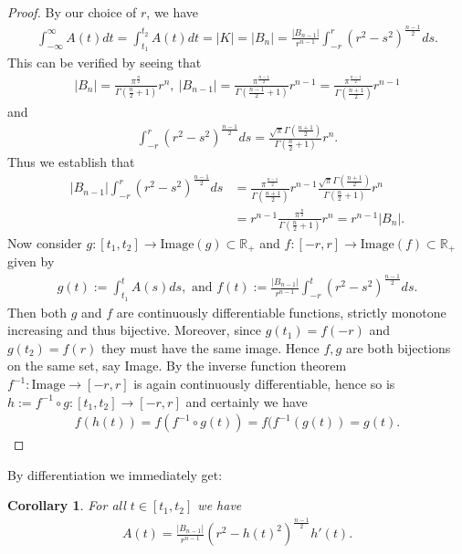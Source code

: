 \documentclass[12pt, a4paper, titlepage]{article}
\newtheorem{corollary}{Corollary}
\begin{document}
\begin{proof}
By our choice of $r$, we have 
\begin{align*}
\int_{- \infty}^\infty A(t)dt = \int_{t_1}^{t_2} A(t)dt = |K|=|B_n| = \frac{|B_{n-1}|}{r^{n-1}} \int_{-r}^r (r^2-s^2)^\frac{n-1}{2}ds.
\end{align*}
This can be verified by seeing that 
\begin{align*}
|B_n| = \frac{\pi^\frac{n}{2}}{\Gamma \left( \frac{n}{2}+1\right)}r^n, \ |B_{n-1}| = \frac{\pi^\frac{n-1}{2}}{\Gamma \left( \frac{n-1}{2}+1\right)}r^{n-1} =\frac{\pi^\frac{n-1}{2}}{\Gamma \left( \frac{n+1}{2}\right)}r^{n-1} 
\end{align*}
and
\begin{align*}
\int_{-r}^r (r^2-s^2)^\frac{n-1}{2}ds = \frac{\sqrt{\pi}  \Gamma\left( \frac{n+1}{2}\right)}{\Gamma \left( \frac{n}{2}+1\right)}r^n.
\end{align*}
Thus we establish that 
\begin{align*}
|B_{n-1}| \int_{-r}^r (r^2-s^2)^\frac{n-1}{2}ds &= \frac{\pi^\frac{n-1}{2}}{\Gamma \left( \frac{n+1}{2}\right)}r^{n-1} \frac{\sqrt{\pi} \Gamma\left( \frac{n+1}{2}\right)}{\Gamma \left( \frac{n}{2}+1\right)}r^n \\
&= r^{n-1} \frac{\pi^\frac{n}{2}}{\Gamma \left( \frac{n}{2}+1\right)}r^n = r^{n-1}|B_n|.
\end{align*}
Now consider $g:[t_1,t_2] \to \text{Image}(g) \subset \mathbb{R}_+$ and $f:[-r,r] \to \text{Image}(f) \subset \mathbb{R}_+$ given by \begin{align*}
g(t):= \int_{t_1}^t A(s)ds, \text{ and } f(t):= \frac{|B_{n-1}|}{r^{n-1}} \int_{-r}^t (r^2-s^2)^\frac{n-1}{2}ds.
\end{align*}
Then both $g$ and $f$ are continuously differentiable functions, strictly monotone increasing and thus bijective. Moreover, since $g(t_1)=f(-r)$ and $g(t_2)=f(r)$ they must have the same image. Hence $f,g$ are both bijections on the same set, say Image. By the inverse function theorem $f^{-1}: \text{Image} \to [-r,r]$ is again continuously differentiable, hence so is $h:=f^{-1} \circ g : [t_1,t_2] \to [-r,r]$ and certainly we have 
\begin{align*}
f(h(t))=f(f^{-1} \circ g (t)) = f(f^{-1}(g(t))=g(t).
\end{align*}
\end{proof}
By differentiation we immediately get:
\begin{corollary} \label{C1} For all $t \in [t_1,t_2]$ we have
\begin{align*}
A(t) = \frac{|B_{n-1}|}{r^{n-1}} (r^2-h(t)^2)^\frac{n-1}{2} h'(t).
\end{align*}
\end{corollary}
\end{document}
